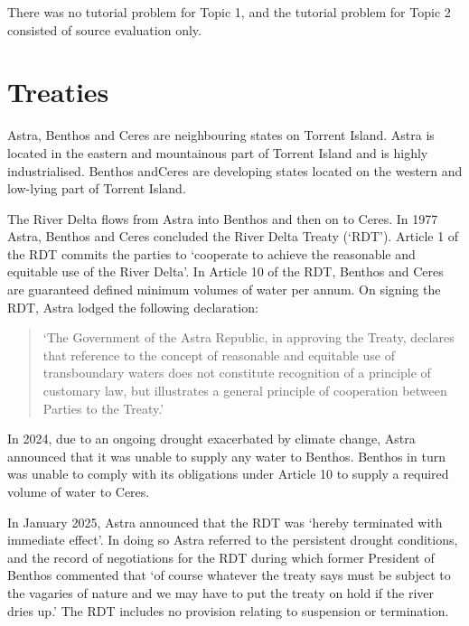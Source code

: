 There was no tutorial problem for Topic 1, and the tutorial problem for Topic 2 consisted of source evaluation only.
\setcounter{section}{2}

\section{Treaties}
\begin{tutorialquestion}
    \flushleft
    Astra, Benthos and Ceres are neighbouring states on Torrent Island. Astra is located  in the eastern and mountainous part of Torrent Island and is highly industrialised. Benthos andCeres are developing states located on the western and low-lying part of Torrent Island.

    \vspace{\baselineskip}

    The River Delta flows from Astra into Benthos and then on to Ceres. In 1977 Astra, Benthos and Ceres concluded the River Delta Treaty (`RDT'). Article 1 of the RDT commits the parties to `cooperate to achieve the reasonable and equitable use of the River Delta'. In Article 10 of the RDT, Benthos and Ceres are guaranteed defined minimum volumes of water per annum. On signing the RDT, Astra lodged the following declaration:

    \begin{quote}
        `The Government of the Astra Republic, in approving the Treaty, declares that reference to the concept of reasonable and equitable use of transboundary waters does not constitute recognition of a principle of customary law, but illustrates a general principle of cooperation between Parties to the Treaty.'
    \end{quote}

    In 2024, due to an ongoing drought exacerbated by climate change, Astra announced that it was unable to supply any water to Benthos. Benthos in turn was unable to comply with its obligations under Article 10 to supply a required volume of water to Ceres.

    \vspace{\baselineskip}

    In January 2025, Astra announced that the RDT was `hereby terminated with immediate effect'. In doing so Astra referred to the persistent drought conditions, and the record of negotiations for the RDT during which former President of Benthos commented that `of course whatever the treaty says must be subject to the vagaries of nature and we may have to put the treaty on hold if the river dries up.' The RDT includes no provision relating to suspension or termination.


\end{tutorialquestion}
